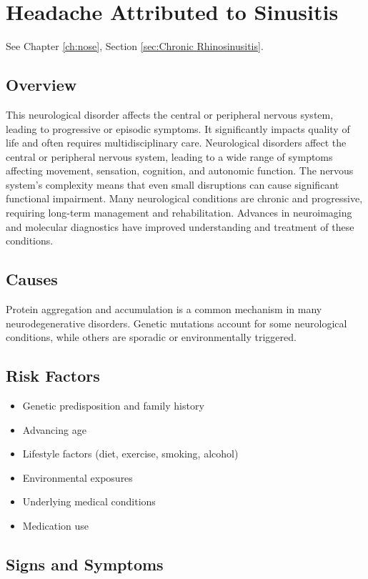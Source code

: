 \chapter{Headache Attributed to Sinusitis}
\label{sec:Headache Sinusitis}
See Chapter \ref{ch:nose}, Section \ref{sec:Chronic Rhinosinusitis}.

\section{Overview}
This neurological disorder affects the central or peripheral nervous system, leading to progressive or episodic symptoms. It significantly impacts quality of life and often requires multidisciplinary care. Neurological disorders affect the central or peripheral nervous system, leading to a wide range of symptoms affecting movement, sensation, cognition, and autonomic function. The nervous system's complexity means that even small disruptions can cause significant functional impairment. Many neurological conditions are chronic and progressive, requiring long-term management and rehabilitation. Advances in neuroimaging and molecular diagnostics have improved understanding and treatment of these conditions.
\section{Causes}
Protein aggregation and accumulation is a common mechanism in many neurodegenerative disorders.  Genetic mutations account for some neurological conditions, while others are sporadic or environmentally triggered.   
\section{Risk Factors}
\begin{itemize}[noitemsep]
  \item Genetic predisposition and family history
  \item Advancing age
  \item Lifestyle factors (diet, exercise, smoking, alcohol)
  \item Environmental exposures
  \item Underlying medical conditions
  \item Medication use
\end{itemize}
\section{Signs and Symptoms}
